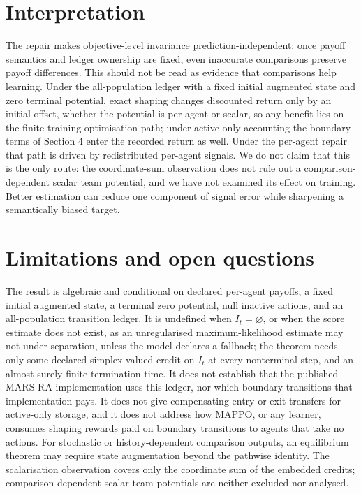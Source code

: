\documentclass{article}
\begin{document}
\section{Interpretation}

The repair makes objective-level invariance prediction-independent: once payoff semantics and ledger ownership are fixed, even inaccurate comparisons preserve payoff differences. This should not be read as evidence that comparisons help learning. Under the all-population ledger with a fixed initial augmented state and zero terminal potential, exact shaping changes discounted return only by an initial offset, whether the potential is per-agent or scalar, so any benefit lies on the finite-training optimisation path; under active-only accounting the boundary terms of Section 4 enter the recorded return as well. Under the per-agent repair that path is driven by redistributed per-agent signals. We do not claim that this is the only route: the coordinate-sum observation does not rule out a comparison-dependent scalar team potential, and we have not examined its effect on training. Better estimation can reduce one component of signal error while sharpening a semantically biased target.

\section{Limitations and open questions}

The result is algebraic and conditional on declared per-agent payoffs, a fixed initial augmented state, a terminal zero potential, null inactive actions, and an all-population transition ledger. It is undefined when \(I_t=\varnothing\), or when the score estimate does not exist, as an unregularised maximum-likelihood estimate may not under separation, unless the model declares a fallback; the theorem needs only some declared simplex-valued credit on \(I_t\) at every nonterminal step, and an almost surely finite termination time. It does not establish that the published MARS-RA implementation uses this ledger, nor which boundary transitions that implementation pays. It does not give compensating entry or exit transfers for active-only storage, and it does not address how MAPPO, or any learner, consumes shaping rewards paid on boundary transitions to agents that take no actions. For stochastic or history-dependent comparison outputs, an equilibrium theorem may require state augmentation beyond the pathwise identity. The scalarisation observation covers only the coordinate sum of the embedded credits; comparison-dependent scalar team potentials are neither excluded nor analysed.
\end{document}
